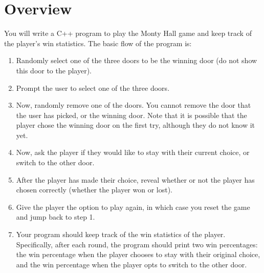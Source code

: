 \documentclass{article}
\begin{document}
\section*{Overview}
You will write a C++ program to play the Monty Hall game and keep track of the player's win statistics. The basic flow of the program is:
\begin{enumerate}
	\item Randomly select one of the three doors to be the winning door (do not show this door to the player).
	\item Prompt the user to select one of the three doors.
	\item Now, randomly remove one of the doors. You cannot remove the door that the user has picked, or the winning door. Note that it is possible that the player chose the winning door on the first try, although they do not know it yet.
	\item Now, ask the player if they would like to stay with their current choice, or switch to the other door.
	\item After the player has made their choice, reveal whether or not the player has chosen correctly (whether the player won or lost). 
	\item Give the player the option to play again, in which case you reset the game and jump back to step 1.
	\item Your program should keep track of the win statistics of the player. Specifically, after each round, the program should print two win percentages: the win percentage when the player chooses to stay with their original choice, and the win percentage when the player opts to switch to the other door.
\end{enumerate}
\end{document}
